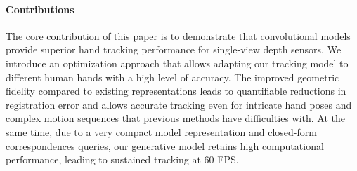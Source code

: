 
\paragraph{Contributions}
%
The core contribution of this paper is to demonstrate that convolutional models provide superior hand tracking performance for single-view depth  sensors.  We introduce an optimization approach that allows adapting our tracking model to different human hands with a high level of accuracy. 
The improved geometric fidelity compared to existing representations leads to quantifiable reductions in registration error and allows accurate tracking even for intricate hand poses and complex motion sequences that previous methods have difficulties with. 
At the same time, due to a very compact model representation and closed-form correspondences queries, our generative model retains high computational performance, leading to sustained tracking at 60 FPS.









